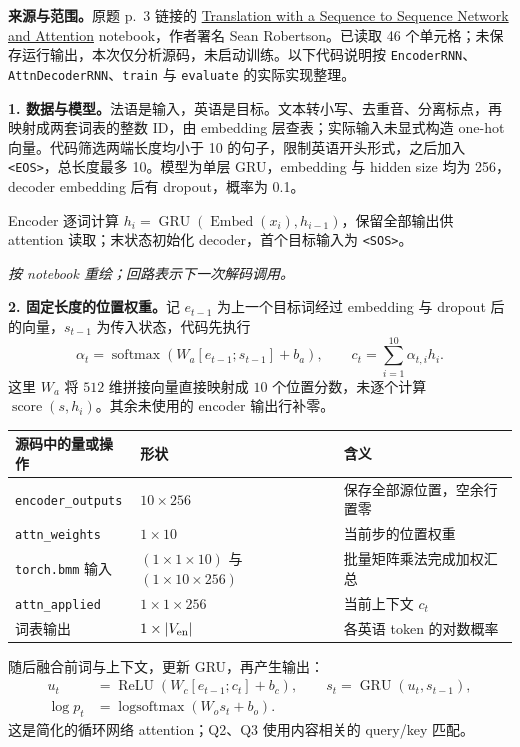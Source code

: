 \nopagebreak[4]
\textbf{来源与范围。}原题 p.~3 链接的
\href{https://colab.research.google.com/drive/1nAUqAP4BQF2xFSq5V-50Bn_xEzx_m0Jm?usp=sharing}{Translation with a Sequence to Sequence Network and Attention}
notebook，作者署名 Sean Robertson。已读取 46 个单元格；未保存运行输出，本次仅分析源码，未启动训练。以下代码说明按 \texttt{EncoderRNN}、\texttt{AttnDecoderRNN}、\texttt{train} 与 \texttt{evaluate} 的实际实现整理。

\textbf{1. 数据与模型。}法语是输入，英语是目标。文本转小写、去重音、分离标点，再映射成两套词表的整数 ID，由 embedding 层查表；实际输入未显式构造 one-hot 向量。代码筛选两端长度均小于 10 的句子，限制英语开头形式，之后加入 \texttt{<EOS>}，总长度最多 10。模型为单层 GRU，embedding 与 hidden size 均为 256，decoder embedding 后有 dropout，概率为 0.1。

Encoder 逐词计算 $h_i=\operatorname{GRU}(\operatorname{Embed}(x_i),h_{i-1})$，保留全部输出供 attention 读取；末状态初始化 decoder，首个目标输入为 \texttt{<SOS>}。
\begin{center}

\end{center}
{\small\textit{按 notebook 重绘；回路表示下一次解码调用。}}

\textbf{2. 固定长度的位置权重。}记 $e_{t-1}$ 为上一个目标词经过 embedding 与 dropout 后的向量，$s_{t-1}$ 为传入状态，代码先执行
\[
 \alpha_t=\operatorname{softmax}\!\left(W_a[e_{t-1};s_{t-1}]+b_a\right),
 \qquad c_t=\sum_{i=1}^{10}\alpha_{t,i}h_i.
\]
这里 $W_a$ 将 $512$ 维拼接向量直接映射成 $10$ 个位置分数，未逐个计算 $\operatorname{score}(s,h_i)$。其余未使用的 encoder 输出行补零。
\begin{center}
\small
\begin{tabularx}{\textwidth}{@{}l l X@{}}
\toprule
源码中的量或操作 & 形状 & 含义 \\
\midrule
\texttt{encoder\_outputs} & $10\times256$ & 保存全部源位置，空余行置零 \\
\texttt{attn\_weights} & $1\times10$ & 当前步的位置权重 \\
\texttt{torch.bmm} 输入 & $(1\times1\times10)$ 与 $(1\times10\times256)$ & 批量矩阵乘法完成加权汇总 \\
\texttt{attn\_applied} & $1\times1\times256$ & 当前上下文 $c_t$ \\
词表输出 & $1\times |V_{\rm en}|$ & 各英语 token 的对数概率 \\
\bottomrule
\end{tabularx}
\end{center}
随后融合前词与上下文，更新 GRU，再产生输出：
\begin{align*}
 u_t&=\operatorname{ReLU}\!\left(W_c[e_{t-1};c_t]+b_c\right),\qquad
 s_t=\operatorname{GRU}(u_t,s_{t-1}),\\
 \log p_t&=\operatorname{logsoftmax}(W_os_t+b_o).
\end{align*}
这是简化的循环网络 attention；Q2、Q3 使用内容相关的 query/key 匹配。

